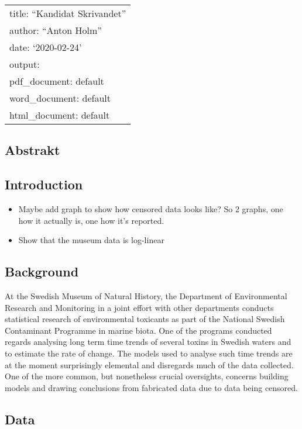\documentclass[]{article}
\author{}
\date{\vspace{-2.5em}}
\providecommand{\tightlist}{%
  \setlength{\itemsep}{0pt}\setlength{\parskip}{0pt}}
\begin{document}
\begin{longtable}[]{@{}l@{}}
\toprule
title: ``Kandidat Skrivandet''\tabularnewline
author: ``Anton Holm''\tabularnewline
date: `2020-02-24'\tabularnewline
output:\tabularnewline
pdf\_document: default\tabularnewline
word\_document: default\tabularnewline
html\_document: default\tabularnewline
\bottomrule
\end{longtable}

\subsection{Abstrakt}\label{abstrakt}

\subsection{Introduction}\label{introduction}

\begin{itemize}
\tightlist
\item
  Maybe add graph to show how censored data looks like? So 2 graphs, one
  how it actually is, one how it's reported.
\item
  Show that the museum data is log-linear
\end{itemize}

\subsection{Background}\label{background}

At the Swedish Museum of Natural History, the Department of
Environmental Research and Monitoring in a joint effort with other
departments conducts statistical research of environmental toxicants as
part of the National Swedish Contaminant Programme in marine biota. One
of the programs conducted regards analysing long term time trends of
several toxins in Swedish waters and to estimate the rate of change. The
models used to analyse such time trends are at the moment surprisingly
elemental and disregards much of the data collected. One of the more
common, but nonetheless crucial oversights, concerns building models and
drawing conclusions from fabricated data due to data being censored.

\subsection{Data}\label{data}
\end{document}
